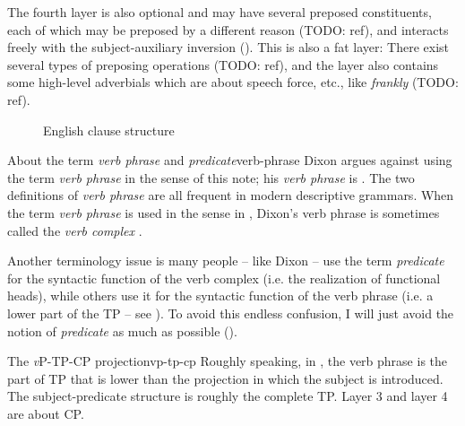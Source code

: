 \documentclass[UTF8, a4paper, oneside, scheme=plain]{ctexrep}
\newcommand*{\term}[1]{\emph{#1}}
\newcommand{\corpus}[1]{\emph{#1}}
\newcommand{\vP}{\textit{v}P}
\begin{document}
The fourth layer is also optional and may have several preposed constituents,
each of which may be preposed by a different reason (TODO: ref),
and interacts freely with the subject-auxiliary inversion 
().
This is also a fat layer:
There exist several types of preposing operations (TODO: ref),
and the layer also contains some high-level adverbials
which are about speech force, etc.,
like \corpus{frankly} (TODO: ref).

\begin{figure}[H]
    \centering
    
    \caption{English clause structure}
    \label{fig:clause-template}
\end{figure}

\begin{infobox}{About the term \term{verb phrase} and \term{predicate}}{verb-phrase}
    Dixon argues against using the term \term{verb phrase} in the sense of this note;
    his \term{verb phrase} is .
    The two definitions of \term{verb phrase} are all frequent in modern descriptive grammars.
    When the term \term{verb phrase} is used in the sense in ,
    Dixon's verb phrase is sometimes called the \term{verb complex} \citep{Friesen2017}.

    Another terminology issue is many people -- like Dixon -- use the term \term{predicate}
    for the syntactic function of the verb complex
    (i.e. the realization of functional heads),
    while others use it for the syntactic function of the verb phrase 
    (i.e. a lower part of the TP -- see ).
    To avoid this endless confusion, 
    I will just avoid the notion of \term{predicate} as much as possible ().
\end{infobox}

\begin{theorybox}{The \vP{}-TP-CP projection}{vp-tp-cp}
    Roughly speaking, in ,
    the verb phrase is the part of TP that is lower than the projection in which the subject is introduced.
    The subject-predicate structure is roughly the complete TP.
    Layer 3 and layer 4 are about CP.
\end{theorybox}
\end{document}
